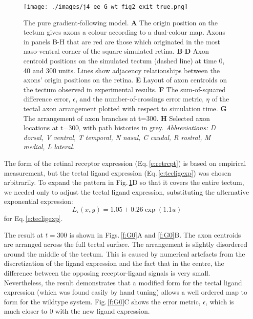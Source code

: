 \documentclass[11pt, a4paper, draft]{article}
\begin{document}
\begin{figure}
\texttt{[image: ./images/j4\_ee\_G\_wt\_fig2\_exit\_true.png]}
\caption{The pure gradient-following model. \textbf{A} The origin position
on the tectum gives axons a colour according to a dual-colour map. Axons in
panels B-H that are red are those which originated in the most naso-ventral
corner of the square simulated retina. \textbf{B}-\textbf{D} Axon centroid
positions on the simulated tectum (dashed line) at time 0, 40 and 300
units. Lines show adjacency relationships between the axons' origin positions
on the retina. \textbf{E} Layout of axon centroids on the tectum observed in
experimental results. \textbf{F} The sum-of-squared difference error,
$\epsilon$, and the number-of-crossings error metric, $\eta$ of the tectal axon
arrangement plotted with respect to simulation time. \textbf{G} The
arrangement of axon branches at t=300. \textbf{H} Selected axon locations at
t=300, with path histories in grey.  \emph{Abbreviations: D dorsal, V ventral, T
temporal, N nasal, C caudal, R rostral, M medial, L lateral.}}
\label{f:G}
\end{figure}

The form of the retinal receptor expression (Eq.\,\ref{e:retrcpt}) is based on
empirical measurement, but the tectal ligand expression
(Eq.\,\ref{e:tecligexp}) was chosen arbitrarily. To expand the pattern in
Fig.\,\ref{f:G}D so that it covers the entire tectum, we needed only to
adjust the tectal ligand expression, substituting the alternative exponential
expression:
%
\begin{equation} \label{e:tecligexp2}
L_i(x,y) = 1.05 + 0.26 \exp(1.1 u)
\end{equation}
%
for Eq.\,\ref{e:tecligexp}.

The result at $t=300$ is shown in Figs.\,\ref{f:G0}A
and \ref{f:G0}B. The axon centroids are arranged across the full tectal
surface.  The arrangement is slightly disordered around the middle of the
tectum. This is caused by numerical artefacts from the discretization of the
ligand expression and the fact that in the centre, the difference between the
opposing receptor-ligand signals is very small. Nevertheless, the result
demonstrates that a modified form for the tectal ligand expression (which was
found easily by hand tuning) allows a well ordered map to form for the
wildtype system. Fig.\,\ref{f:G0}C shows the error metric, $\epsilon$,
which is much closer to 0 with the new ligand expression.
\end{document}
